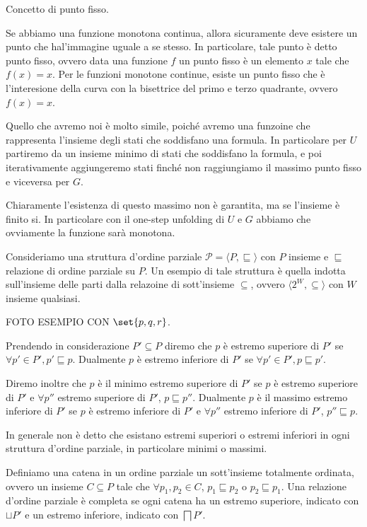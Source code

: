 Concetto di punto fisso.

Se abbiamo una funzione monotona continua, allora sicuramente deve esistere un punto che hal'immagine uguale a se stesso. In particolare, tale punto è detto punto fisso, ovvero data una funzione \(f\) un punto fisso è un elemento \(x\) tale che \(f(x) = x\). Per le funzioni monotone continue, esiste un punto fisso che è l'interesione della curva con la bisettrice del primo e terzo quadrante, ovvero \(f(x) = x\). 

Quello che avremo noi è molto simile, poiché avremo una funzoine che rappresenta l'insieme degli stati che soddisfano una formula. In particolare per \(U\) partiremo da un insieme minimo di stati che soddisfano la formula, e poi iterativamente aggiungeremo stati finché non raggiungiamo il massimo punto fisso e viceversa per \(G\).

Chiaramente l'esistenza di questo massimo non è garantita, ma se l'insieme è finito si. In particolare con il one-step unfolding di \(U\) e \(G\) abbiamo che ovviamente la funzione sarà monotona.

Consideriamo una struttura d'ordine parziale \(\mathcal{P} = \langle P, \sqsubseteq  \rangle\) con \(P\) insieme e \(\sqsubseteq \) relazione di ordine parziale su \(P\). Un esempio di tale struttura è quella indotta sull'insieme delle parti dalla relazoine di sott'insieme \(\subseteq\), ovvero \(\langle 2^W, \subseteq \rangle\) con \(W\) insieme qualsiasi. 

FOTO ESEMPIO CON \(\set{p,q,r}\).

Prendendo in considerazione \(P'\subseteq P\) diremo che \(p\) è estremo superiore di \(P'\) se \(\forall p' \in P', p' \sqsubseteq  p\). 
Dualmente \(p\) è estremo inferiore di \(P'\) se \(\forall p' \in P', p \sqsubseteq  p'\).

Diremo inoltre che \(p\) è il minimo estremo superiore di \(P'\) se \(p\) è estremo superiore di \(P'\) e \(\forall p''\) estremo superiore di \(P'\), \(p \sqsubseteq  p''\). Dualmente \(p\) è il massimo estremo inferiore di \(P'\) se \(p\) è estremo inferiore di \(P'\) e \(\forall p''\) estremo inferiore di \(P'\), \(p'' \sqsubseteq  p\).

\begin{note}{}
  In generale non è detto che esistano estremi superiori o estremi inferiori in ogni struttura d'ordine parziale, in particolare minimi o massimi.
\end{note}

Definiamo una catena in un ordine parziale un sott'insieme totalmente ordinata, ovvero un insieme \(C\subseteq P\) tale che \(\forall p_1, p_2 \in C\), \(p_1 \sqsubseteq  p_2\) o \(p_2 \sqsubseteq  p_1\). Una relazione d'ordine parziale è completa se ogni catena ha un estremo superiore, indicato con \(\sqcup P'\) e un estremo inferiore, indicato con \(\bigsqcap P'\).

